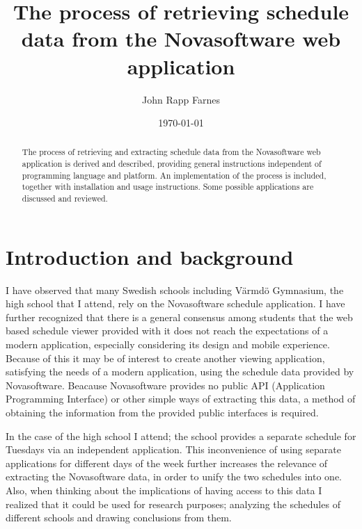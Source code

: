 \documentclass{article}
\begin{document}
	\title{The process of retrieving schedule data from the Novasoftware web application}
	
	\author{John Rapp Farnes}
	
	\date{\today}
	
	\maketitle
	
	\begin{abstract}\noindent
		The process of retrieving and extracting schedule data from the Novasoftware web application is derived and described, providing general instructions independent of programming language and platform. %
		An implementation of the process is included, together with installation and usage instructions. Some possible applications are discussed and reviewed.
	\end{abstract}
	
	\newpage
	
	\tableofcontents
	
	\cleardoublepage
	\pagestyle{plain}
	
	\section{Introduction and background}
	I have observed that many Swedish schools including Värmdö Gymnasium, the high school that I attend, rely on the Novasoftware schedule application. I have further recognized that there is a general consensus among students that the web based schedule viewer provided with it does not reach the expectations of a modern application, especially considering its design and mobile experience. Because of this it may be of interest to create another viewing application, satisfying the needs of a modern application, using the schedule data provided by Novasoftware. Beacause Novasoftware provides no public API (Application Programming Interface) or other simple ways of extracting this data, a method of obtaining the information from the provided public interfaces is required.
	
	In the case of the high school I attend; the school provides a separate schedule for Tuesdays via an independent application. This inconvenience of using separate applications for different days of the week further increases the relevance of extracting the Novasoftware data, in order to unify the two schedules into one. Also, when thinking about the implications of having access to this data I realized that it could be used for research purposes; analyzing the schedules of different schools and drawing conclusions from them.
	
\end{document}
